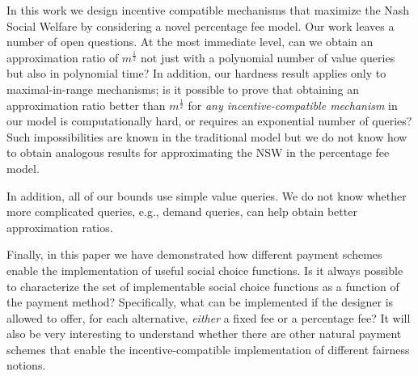 \documentclass{article}
\begin{document}
In this work we design incentive compatible mechanisms that maximize the Nash Social Welfare by considering a novel percentage fee model. Our work leaves a number of open questions. At the most immediate level, can we obtain an approximation ratio of $m^{\frac 1 2}$ not just with a polynomial number of value queries but also in polynomial time? In addition, our hardness result applies only to maximal-in-range mechanisms; is it possible to prove that obtaining an approximation ratio better than $m^\frac 1 2$ for {\em any incentive-compatible mechanism} in our model is computationally hard, or requires an exponential number of queries? Such impossibilities are known in the traditional model \cite{D11,DV11,DV12} but we do not know how to obtain analogous results for approximating the NSW in the percentage fee model.

In addition, all of our bounds use simple value queries. We do not know whether more complicated queries, e.g., demand queries, can help obtain better approximation ratios.

Finally, in this paper we have demonstrated how different payment schemes enable the implementation of useful social choice functions. Is it always possible to characterize the set of implementable social choice functions as a function of the payment method? Specifically, what can be implemented if the designer is allowed to offer, for each alternative, \emph{either} a fixed fee or a percentage fee? It will also be very interesting to understand whether there are other natural payment schemes that enable the incentive-compatible implementation of different fairness notions.

    
\end{document}
